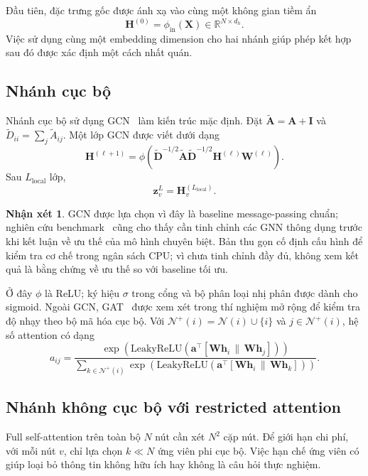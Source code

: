 \documentclass[12pt,a4paper]{article}
\numberwithin{equation}{section}
\theoremstyle{definition}
\newtheorem{remark}{Nhận xét}[section]
\begin{document}
Đầu tiên, đặc trưng gốc được ánh xạ vào cùng một không gian tiềm ẩn
\begin{equation}
\mathbf{H}^{(0)} = \phi_{\text{in}}(\mathbf{X}) \in \mathbb{R}^{N \times d_h}.
\end{equation}
Việc sử dụng cùng một embedding dimension cho hai nhánh giúp phép kết hợp sau đó được xác định một cách nhất quán.

\subsection{Nhánh cục bộ}
Nhánh cục bộ sử dụng GCN~\cite{kipf2017gcn} làm kiến trúc mặc định. Đặt $\tilde{\mathbf{A}} = \mathbf{A} + \mathbf{I}$ và $\tilde{D}_{ii} = \sum_j \tilde{A}_{ij}$. Một lớp GCN được viết dưới dạng
\begin{equation}
\mathbf{H}^{(\ell+1)} = \phi\left(\tilde{\mathbf{D}}^{-1/2}\tilde{\mathbf{A}}\tilde{\mathbf{D}}^{-1/2}\mathbf{H}^{(\ell)}\mathbf{W}^{(\ell)}\right).
\end{equation}
Sau $L_{\text{local}}$ lớp,
\begin{equation}
\mathbf{z}_v^L = \mathbf{H}_v^{(L_{\text{local}})}.
\end{equation}

\begin{remark}
GCN được lựa chọn vì đây là baseline message-passing chuẩn; nghiên cứu benchmark~\cite{platonov2023critical} cũng cho thấy cần tinh chỉnh các GNN thông dụng trước khi kết luận về ưu thế của mô hình chuyên biệt. Bản thu gọn cố định cấu hình để kiểm tra cơ chế trong ngân sách CPU; vì chưa tinh chỉnh đầy đủ, không xem kết quả là bằng chứng về ưu thế so với baseline tối ưu.
\end{remark}

Ở đây $\phi$ là ReLU; ký hiệu $\sigma$ trong cổng và bộ phân loại nhị phân được dành cho sigmoid. Ngoài GCN, GAT~\cite{velickovic2018gat} được xem xét trong thí nghiệm mở rộng để kiểm tra độ nhạy theo bộ mã hóa cục bộ. Với $\mathcal{N}^+(i)=\mathcal{N}(i)\cup\{i\}$ và $j\in\mathcal{N}^+(i)$, hệ số attention có dạng
\begin{equation}
 a_{ij} = \frac{\exp\left(\text{LeakyReLU}\left(\mathbf{a}^\top[\mathbf{W}\mathbf{h}_i \,\|\, \mathbf{W}\mathbf{h}_j]\right)\right)}{\sum_{k \in \mathcal{N}^+(i)} \exp\left(\text{LeakyReLU}\left(\mathbf{a}^\top[\mathbf{W}\mathbf{h}_i \,\|\, \mathbf{W}\mathbf{h}_k]\right)\right)}.
\end{equation}

\subsection{Nhánh không cục bộ với restricted attention}
Full self-attention trên toàn bộ $N$ nút cần xét $N^2$ cặp nút. Để giới hạn chi phí, với mỗi nút $v$, chỉ lựa chọn $k \ll N$ ứng viên phi cục bộ. Việc hạn chế ứng viên có giúp loại bỏ thông tin không hữu ích hay không là câu hỏi thực nghiệm.
\medskip
\end{document}
